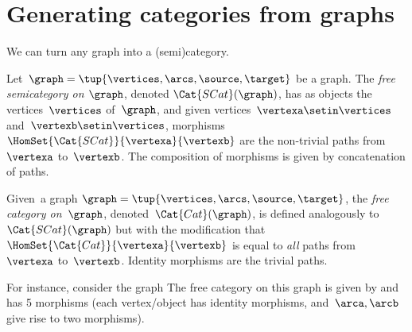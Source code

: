 
\section[Categories from graphs]{Generating categories from graphs}
\label{sec:catsfromgraphs}

We can turn any graph into a (semi)category.

\begin{ctdefinition}
    \label{def:free-semicategory}
    Let~$\graph=\tup{\vertices,\arcs,\source,\target}$ be a graph.
    The \emph{free semicategory on $\graph$}, denoted $\Cat{SCat}(\graph)$, has as objects the vertices~$\vertices$ of~$\graph$, and given vertices~$\vertexa\setin \vertices$ and~$\vertexb\setin \vertices$, morphisms~$\HomSet{\Cat{SCat}}{\vertexa}{\vertexb}$ are the non-trivial paths from~$\vertexa$ to~$\vertexb$.
    The composition of morphisms is given by concatenation of paths.
\end{ctdefinition}


\begin{ctdefinition}
    \label{def:free-category}
    Given~a graph $\graph=\tup{\vertices,\arcs,\source,\target}$, the \emph{free category on~$\graph$}, denoted~$\Cat{Cat}(\graph)$, is defined analogously to $\Cat{SCat}(\graph)$ but with the modification that $\HomSet{\Cat{Cat}}{\vertexa}{\vertexb}$ is equal to \emph{all} paths from~$\vertexa$ to~$\vertexb$. Identity morphisms are the trivial paths.
\end{ctdefinition}



For instance, consider the graph
%
%
The free category on this graph is given by
%
%
and has 5 morphisms (each vertex/object has identity morphisms, and~$\arca,\arcb$ give rise to two morphisms).

